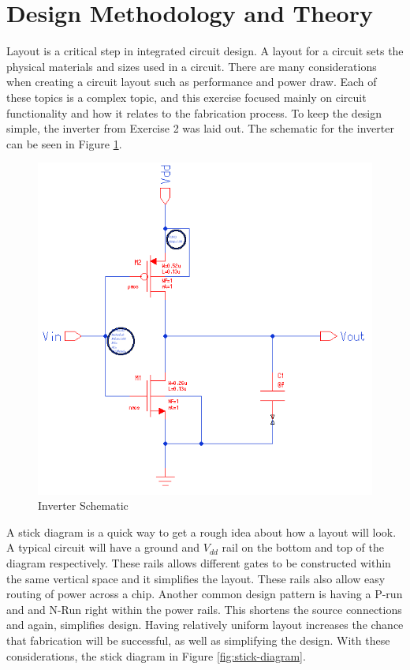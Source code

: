 \documentclass[11pt]{article}
\begin{document}
\section{Design Methodology and Theory}

	Layout is a critical step in integrated circuit design. A layout for a circuit sets the physical materials and sizes used in a circuit. There are many considerations when creating a circuit layout such as performance and power draw. Each of these topics is a complex topic, and this exercise focused mainly on circuit functionality and how it relates to the fabrication process. To keep the design simple, the inverter from Exercise 2 was laid out. The schematic for the inverter can be seen in Figure \ref{fig:inverter-schematic}.

	\begin{figure}[H]
		\centering
		\includegraphics[width=0.7\linewidth]{"Pictures/Inverter Schematic"}
		\caption{Inverter Schematic}
		\label{fig:inverter-schematic}
	\end{figure}

	A stick diagram is a quick way to get a rough idea about how a layout will look. A typical circuit will have a ground and $V_{dd}$ rail on the bottom and top of the diagram respectively. These rails allows different gates to be constructed within the same vertical space and it simplifies the layout. These rails also allow easy routing of power across a chip. Another common design pattern is having a P-run and and N-Run right within the power rails. This shortens the source connections and again, simplifies design. Having relatively uniform layout increases the chance that fabrication will be successful, as well as simplifying the design. With these considerations, the stick diagram in Figure \ref{fig:stick-diagram}. 
\end{document}
